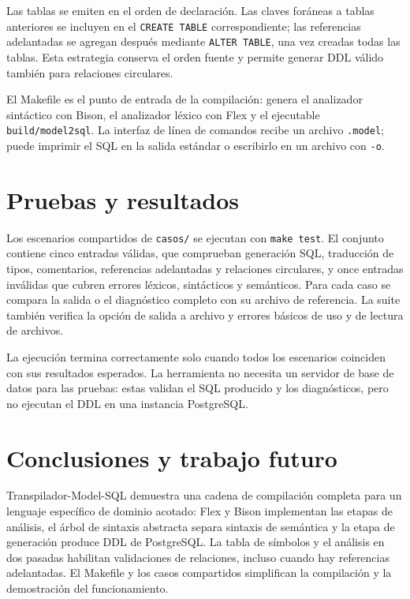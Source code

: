 \documentclass[runningheads]{llncs}
\begin{document}
Las tablas se emiten en el orden de declaración. Las claves foráneas a tablas
anteriores se incluyen en el \texttt{CREATE TABLE} correspondiente; las
referencias adelantadas se agregan después mediante \texttt{ALTER TABLE}, una
vez creadas todas las tablas. Esta estrategia conserva el orden fuente y permite
generar DDL válido también para relaciones circulares.

El Makefile es el punto de entrada de la compilación: genera el analizador
sintáctico con Bison, el analizador léxico con Flex y el ejecutable
\texttt{build/model2sql}. La interfaz de línea de comandos recibe un
archivo \texttt{.model}; puede imprimir el SQL en la salida estándar o escribirlo
en un archivo con \texttt{-o}.

\section{Pruebas y resultados}

Los escenarios compartidos de \texttt{casos/} se ejecutan con \texttt{make test}.
El conjunto contiene cinco entradas válidas, que comprueban generación SQL,
traducción de tipos, comentarios, referencias adelantadas y relaciones circulares,
y once entradas inválidas que cubren errores léxicos, sintácticos y semánticos.
Para cada caso se compara la salida o el diagnóstico completo con su archivo de referencia.
La suite también verifica la opción de salida a archivo y errores básicos de uso
y de lectura de archivos.

La ejecución termina correctamente solo cuando todos los escenarios coinciden
con sus resultados esperados. La herramienta no necesita un servidor de base
de datos para las pruebas: estas validan el SQL producido y los diagnósticos,
pero no ejecutan el DDL en una instancia PostgreSQL.

\section{Conclusiones y trabajo futuro}

Transpilador-Model-SQL demuestra una cadena de compilación completa para un
lenguaje específico de dominio acotado: Flex y Bison implementan las etapas de
análisis, el árbol de sintaxis abstracta separa sintaxis de semántica y la etapa
de generación produce DDL de PostgreSQL. La tabla de símbolos y el análisis en dos
pasadas habilitan validaciones de relaciones, incluso cuando hay referencias
adelantadas. El Makefile y los casos compartidos simplifican la compilación y
la demostración del funcionamiento.
\end{document}
